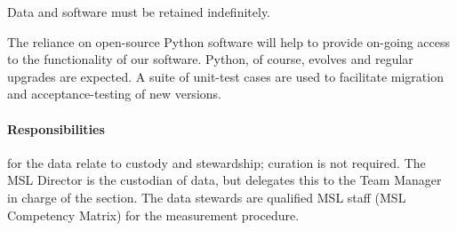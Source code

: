 Data and software must be retained indefinitely. 

The reliance on open-source Python software will help to provide on-going access to the functionality of our software. Python, of course, evolves and regular upgrades are expected. A suite of unit-test cases are used to facilitate migration and acceptance-testing of new versions.

\paragraph{Responsibilities} for the data relate to custody and stewardship; curation is not required. The MSL Director is the custodian of data, but delegates this to the Team Manager in charge of the section. The data stewards are qualified MSL staff (MSL Competency Matrix) for the measurement procedure. 
